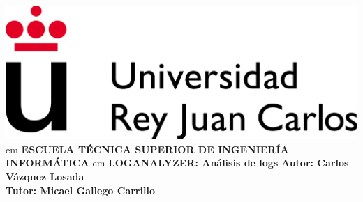 \documentclass[12pt]{article}
\begin{document}
	\begin{center}
		\includegraphics{images/logourjc}
		 em
		\Large\textbf{ESCUELA TÉCNICA SUPERIOR DE INGENIERÍA INFORMÁTICA}
		 em
		\Large\textbf{LOGANALYZER: Análisis de logs}
		\vfill
		\textbf{Autor: Carlos Vázquez Losada}\\
		\textbf{Tutor: Micael Gallego Carrillo}
	\end{center}
\end{document}
